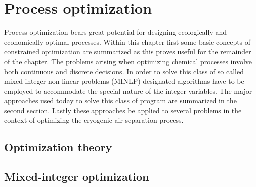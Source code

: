 \chapter{Process optimization}
\label{chp:optimization}
Process optimization bears great potential for designing ecologically and economically optimal processes.
Within this chapter first some basic concepts of constrained optimization are summarized as this proves
useful for the remainder of the chapter. The problems arising when optimizing chemical processes involve
both continuous and discrete decisions. In order to solve this class of so called mixed-integer non-linear
problems (MINLP) designated algorithms have to be employed to accommodate the special nature of the integer
variables. The major approaches used today to solve this class of program  are summarized in the second section.
Lastly these approaches be applied to several problems in the context of optimizing the cryogenic air separation
process.

    \section{Optimization theory}
    \label{sec:opt:theory}
    

    \section{Mixed-integer optimization}
    \label{sec:opt:MINLP}
    
